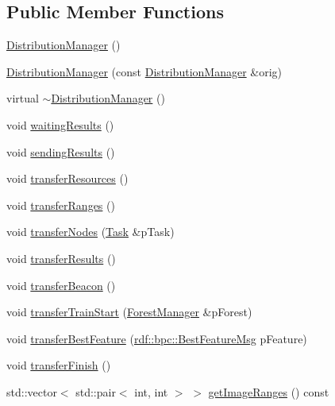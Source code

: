 \subsection*{Public Member Functions}
\begin{DoxyCompactItemize}
\item 
\hyperlink{classrdf_1_1DistributionManager_ad305a637e032d254c3884911294919e4}{Distribution\+Manager} ()
\item 
\hyperlink{classrdf_1_1DistributionManager_ab0df571638e2f1a645a6b10a46be43dc}{Distribution\+Manager} (const \hyperlink{classrdf_1_1DistributionManager}{Distribution\+Manager} \&orig)
\item 
virtual \hyperlink{classrdf_1_1DistributionManager_a5165d8567d99652270a892b576bc8d41}{$\sim$\+Distribution\+Manager} ()
\item 
void \hyperlink{classrdf_1_1DistributionManager_ad030f06a725590893f186cf95df7ed19}{waiting\+Results} ()
\item 
void \hyperlink{classrdf_1_1DistributionManager_aaa23849f108cf3199eb6a076c37a269c}{sending\+Results} ()
\item 
void \hyperlink{classrdf_1_1DistributionManager_aee4c4143848ea57742d79f8ee137b4c7}{transfer\+Resources} ()
\item 
void \hyperlink{classrdf_1_1DistributionManager_af601ca87a8a5b21632e5c70de253d8cb}{transfer\+Ranges} ()
\item 
void \hyperlink{classrdf_1_1DistributionManager_ac98b0403d6311d00e7b95c03fa4aa0f3}{transfer\+Nodes} (\hyperlink{classrdf_1_1Task}{Task} \&p\+Task)
\item 
void \hyperlink{classrdf_1_1DistributionManager_a16efc159bccc8c621d28d62310cfb2e0}{transfer\+Results} ()
\item 
void \hyperlink{classrdf_1_1DistributionManager_a30ac28e002aebe633229c993a65437fd}{transfer\+Beacon} ()
\item 
void \hyperlink{classrdf_1_1DistributionManager_a7430723023243687df8181b7575cb167}{transfer\+Train\+Start} (\hyperlink{classrdf_1_1ForestManager}{Forest\+Manager} \&p\+Forest)
\item 
void \hyperlink{classrdf_1_1DistributionManager_ab28b3c19afaae2917fdac53f426b1835}{transfer\+Best\+Feature} (\hyperlink{classrdf_1_1bpc_1_1BestFeatureMsg}{rdf\+::bpc\+::\+Best\+Feature\+Msg} p\+Feature)
\item 
void \hyperlink{classrdf_1_1DistributionManager_acc9fe7a5966360e5e82d916a0eed1712}{transfer\+Finish} ()
\item 
std\+::vector$<$ std\+::pair$<$ int, int $>$ $>$ \hyperlink{classrdf_1_1DistributionManager_a31ba2ded77d4addc0a245daf08e6a704}{get\+Image\+Ranges} () const 

\end{DoxyCompactItemize}
